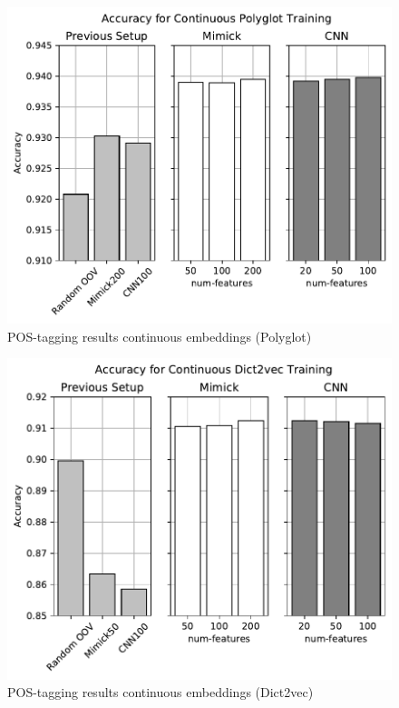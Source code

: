       \begin{figure}[H]
        \centering
        \includegraphics[width=0.8\linewidth]{images/continuous_polyglot.pdf}
        \caption{POS-tagging results continuous embeddings (Polyglot)}
        \label{fig:postag_polyglot_continuous_results}
      \end{figure}
      \begin{figure}[H]
        \centering
        \includegraphics[width=0.8\linewidth]{images/continuous_dict2vec.pdf}
        \caption{POS-tagging results continuous embeddings (Dict2vec)}
        \label{fig:postag_dict2vec_continuous_results}
      \end{figure}

